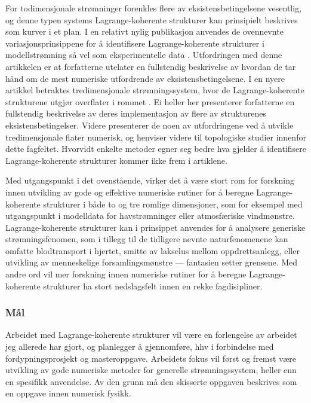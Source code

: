 For todimensjonale strømninger forenkles flere av eksistensbetingelsene
vesentlig, og denne typen systems Lagrange-koherente strukturer kan
prinsipielt beskrives som kurver i et plan. I en relativt nylig publikasjon
anvendes de ovennevnte variasjonsprinsippene for å identifisere
Lagrange-koherente strukturer i modellstrømning så vel som eksperimentelle data
\parencite{farazmand2012computing}. Utfordringen med denne artikkelen er at
forfatterne utelater en fullstendig beskrivelse av hvordan de tar hånd om
de mest numeriske utfordrende av eksistensbetingelsene. I en nyere artikkel
betraktes tredimensjonale strømningssystem, hvor de Lagrange-koherente
strukturene utgjør overflater i rommet \parencite{oettinger2016autonomous}.
Ei heller her presenterer forfatterne en fullstendig beskrivelse av deres
implementasjon av flere av strukturenes eksistensbetingelser. Videre presenterer
de noen av utfordringene ved å utvikle tredimensjonale flater numerisk, og
henviser videre til topologiske studier innenfor dette fagfeltet. Hvorvidt
enkelte metoder egner seg bedre hva gjelder å identifisere Lagrange-koherente
strukturer kommer ikke frem i artiklene.

Med utgangspunkt i det ovenstående, virker det å være stort rom for forskning
innen utvikling av gode og effektive numeriske rutiner for å beregne
Lagrange-koherente strukturer i både to og tre romlige dimensjoner, som for
eksempel med utgangspunkt i modelldata for havstrømninger eller atmosfæriske
vindmønstre. Lagrange-koherente strukturer kan i prinsippet anvendes for å
analysere generiske strømningsfenomen, som i tillegg til de tidligere nevnte
naturfenomenene kan omfatte blodtransport i hjertet, smitte av lakselus
mellom oppdrettsanlegg, eller utvikling av menneskelige forsamlingsmønstre ---
fantasien setter grensene. Med andre ord vil mer forskning innen numeriske
rutiner for å beregne Lagrange-koherente strukturer ha stort nedslagsfelt innen
en rekke fagdisipliner.

\subsubsection*{Mål}

Arbeidet med Lagrange-koherente strukturer vil være en forlengelse av
arbeidet jeg allerede har gjort, og planlegger å gjennomføre, hhv i forbindelse
med fordypningsprosjekt og masteroppgave. Arbeidets fokus vil først og fremst
være utvikling av gode numeriske metoder for generelle strømningssystem,
heller enn en spesifikk anvendelse. Av den grunn må den skisserte oppgaven
beskrives som en oppgave innen numerisk fysikk.

